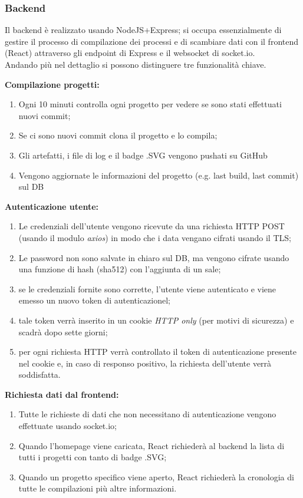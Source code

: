 \documentclass{report}
\begin{document}
\subsubsection{Backend}
Il backend è realizzato usando NodeJS+Express;  si occupa essenzialmente di gestire il processo di compilazione dei processi e di scambiare dati con il frontend (React) attraverso gli endpoint di Express e il websocket di socket.io.\\
Andando più nel dettaglio si possono distinguere tre funzionalità chiave.

\textbf{Compilazione progetti:}
\begin{enumerate}
\item Ogni 10 minuti controlla ogni progetto per vedere se sono stati effettuati nuovi commit;
\item Se ci sono nuovi commit clona il progetto e lo compila;
\item Gli artefatti, i file di log e il badge .SVG vengono pushati su GitHub
\item Vengono aggiornate le informazioni del progetto (e.g. last build, last commit) sul DB
\end{enumerate}
\textbf{Autenticazione utente:}
\begin{enumerate}
\item Le credenziali dell'utente vengono ricevute da una richiesta HTTP POST (usando il modulo \textit{axios}) in modo che i data vengano cifrati usando il TLS;
\item Le password non sono salvate in chiaro sul DB, ma vengono cifrate usando una funzione di hash (sha512) con l'aggiunta di un sale;
\item se le credenziali fornite sono corrette, l'utente viene autenticato e viene emesso un nuovo token di autenticazionel;
\item tale token verrà inserito in un cookie \textit{HTTP only} (per motivi di sicurezza) e scadrà dopo sette giorni;
\item per ogni richiesta HTTP verrà controllato il token di autenticazione presente nel cookie e, in caso di responso positivo, la richiesta dell'utente verrà soddisfatta. 
\end{enumerate}
\textbf{Richiesta dati dal frontend:}
\begin{enumerate}
\item Tutte le richieste di dati che non necessitano di autenticazione vengono effettuate usando socket.io;
\item Quando l'homepage viene caricata, React richiederà al backend la lista di tutti i progetti con tanto di badge .SVG;
\item Quando un progetto specifico viene aperto, React richiederà la cronologia di tutte le compilazioni più altre informazioni.
\end{enumerate}
\end{document}
